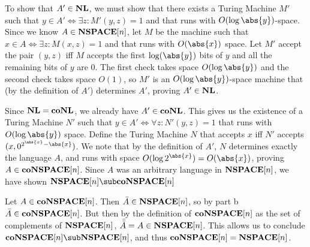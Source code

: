 \documentclass{article}
\begin{document}
\begin{alphalist}
\item To show that $A' \in \mathbf{NL}$, we must show that there exists a Turing Machine $M'$ such that $y \in A' \iff \exists z: M'(y, z) = 1$ and that runs with $O(\log\abs{y})$-space. Since we know $A \in \mathbf{NSPACE}[n]$, let $M$ be the machine such that $x \in A \iff \exists z: M(x, z) = 1$ and that runs with $O(\abs{x})$ space. Let $M'$ accept the pair $(y, z)$ iff $M$ accepts the first $\log(\abs{y})$ bits of $y$ and all the remaining bits of $y$ are 0. The first check takes space $O(\log\abs{y})$ and the second check takes space $O(1)$, so $M'$ is an $O(\log\abs{y})$-space machine that (by the definition of $A'$) determines $A'$, proving $A' \in \mathbf{NL}$. 
\item Since $\mathbf{NL} = \mathbf{coNL}$, we already have $A' \in \mathbf{coNL}$. This gives us the existence of a Turing Machine $N'$ such that $y \in A' \iff \forall z: N'(y, z) = 1$ that runs with $O(\log\abs{y})$ space. Define the Turing Machine $N$ that accepts $x$ iff $N'$ accepts $(x, 0^{2^{\abs{x}} - \abs{x}})$. 
We note that by the definition of $A'$, $N$ determines exactly the language $A$, and runs with space $O(\log{2^{\abs{x}}}) = O(\abs{x})$, proving $A \in \mathbf{coNSPACE}[n]$. Since $A$ was an arbitrary language in $\mathbf{NSPACE}[n]$, we have shown $\NSP[n] \sub \coNSP[n]$
\item Let $A \in \mathbf{coNSPACE}[n]$. Then $\bar{A} \in \mathbf{NSPACE}[n]$, so by part b $\bar{A} \in \mathbf{coNSPACE}[n]$. But then by the definition of $\mathbf{coNSPACE}[n]$ as the set of complements of $\mathbf{NSPACE}[n]$, $\bar{\bar{A}} = A \in \mathbf{NSPACE}[n]$. This allows us to conclude $\coNSP[n] \sub \NSP[n]$, and thus $\mathbf{coNSPACE}[n] = \mathbf{NSPACE}[n]$.
\end{alphalist}
\end{document}
